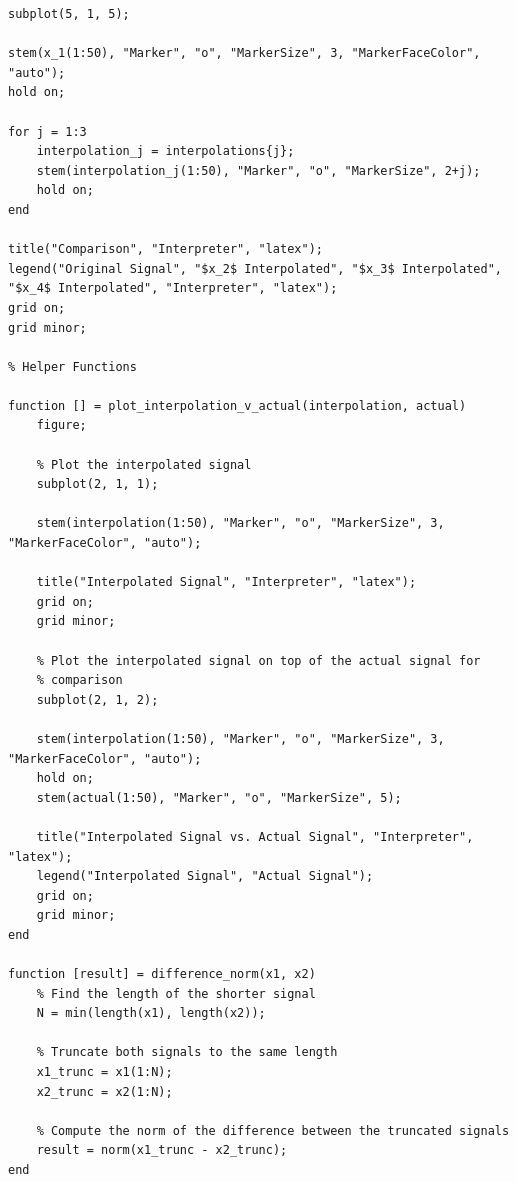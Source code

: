 \documentclass{article}[a4paper]
\begin{document}
\begin{lstlisting}[caption={Main Code}, label=interpol_main]
% Plot all interpolations and the original signal on top of each other
subplot(5, 1, 5);

stem(x_1(1:50), "Marker", "o", "MarkerSize", 3, "MarkerFaceColor", "auto");
hold on;

for j = 1:3
	interpolation_j = interpolations{j};
	stem(interpolation_j(1:50), "Marker", "o", "MarkerSize", 2+j);
	hold on;
end

title("Comparison", "Interpreter", "latex");
legend("Original Signal", "$x_2$ Interpolated", "$x_3$ Interpolated", "$x_4$ Interpolated", "Interpreter", "latex");
grid on;
grid minor;

% Helper Functions

function [] = plot_interpolation_v_actual(interpolation, actual)
	figure;
	
	% Plot the interpolated signal
	subplot(2, 1, 1);
	
	stem(interpolation(1:50), "Marker", "o", "MarkerSize", 3, "MarkerFaceColor", "auto");
	
	title("Interpolated Signal", "Interpreter", "latex");
	grid on;
	grid minor;
	
	% Plot the interpolated signal on top of the actual signal for
	% comparison
	subplot(2, 1, 2);
	
	stem(interpolation(1:50), "Marker", "o", "MarkerSize", 3, "MarkerFaceColor", "auto");
	hold on;
	stem(actual(1:50), "Marker", "o", "MarkerSize", 5);
	
	title("Interpolated Signal vs. Actual Signal", "Interpreter", "latex");
	legend("Interpolated Signal", "Actual Signal");
	grid on;
	grid minor;
end

function [result] = difference_norm(x1, x2)
	% Find the length of the shorter signal
	N = min(length(x1), length(x2));
	
	% Truncate both signals to the same length
	x1_trunc = x1(1:N);
	x2_trunc = x2(1:N);
	
	% Compute the norm of the difference between the truncated signals
	result = norm(x1_trunc - x2_trunc);
end
	\end{lstlisting}
	
\end{document}
